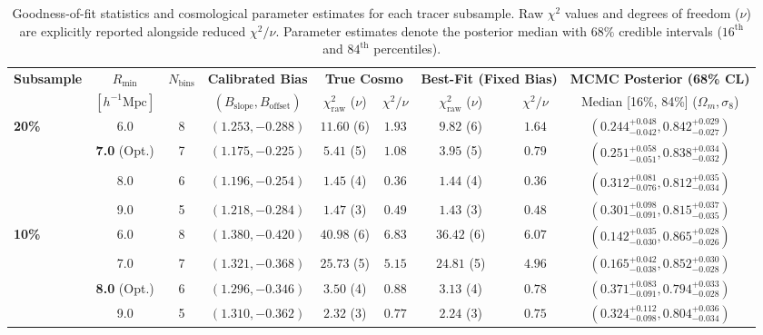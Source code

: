 \documentclass[12pt]{report}
\begin{document}
\begin{table}[H]
    \centering
    \caption{Goodness-of-fit statistics and cosmological parameter estimates for each tracer subsample. Raw $\chi^2$ values and degrees of freedom ($\nu$) are explicitly reported alongside reduced $\chi^2/\nu$. Parameter estimates denote the posterior median with $68\%$ credible intervals ($16^{\mathrm{th}}$ and $84^{\mathrm{th}}$ percentiles).}
    \label{tab:subsample_scan_results}
    \setlength{\tabcolsep}{5pt}
    \small
    \begin{tabular}{lcccccccc}
        \toprule
        \textbf{Subsample} & \textbf{$R_{\mathrm{min}}$} & \textbf{$N_{\mathrm{bins}}$} & \textbf{Calibrated Bias} & \multicolumn{2}{c}{\textbf{True Cosmo}} & \multicolumn{2}{c}{\textbf{Best-Fit (Fixed Bias)}} & \textbf{MCMC Posterior (68\% CL)} \\
        & $[h^{-1}\mathrm{Mpc}]$ & & $(B_{\mathrm{slope}}, B_{\mathrm{offset}})$ & $\chi^2_{\mathrm{raw}}$ ($\nu$) & $\chi^2/\nu$ & $\chi^2_{\mathrm{raw}}$ ($\nu$) & $\chi^2/\nu$ & Median [16\%, 84\%] ($\Omega_m, \sigma_8$) \\
        \midrule
        \textbf{20\%} 
        & 6.0 & 8 & $(1.253, -0.288)$ & $11.60$ (6) & $1.93$ & $9.82$ (6) & $1.64$ & $(0.244^{+0.048}_{-0.042}, 0.842^{+0.029}_{-0.027})$ \\
        & \textbf{7.0} (Opt.) & 7 & $(1.175, -0.225)$ & $5.41$ (5) & $\mathbf{1.08}$ & $3.95$ (5) & $\mathbf{0.79}$ & $\mathbf{(0.251^{+0.058}_{-0.051}, 0.838^{+0.034}_{-0.032})}$ \\
        & 8.0 & 6 & $(1.196, -0.254)$ & $1.45$ (4) & $0.36$ & $1.44$ (4) & $0.36$ & $(0.312^{+0.081}_{-0.076}, 0.812^{+0.035}_{-0.034})$ \\
        & 9.0 & 5 & $(1.218, -0.284)$ & $1.47$ (3) & $0.49$ & $1.43$ (3) & $0.48$ & $(0.301^{+0.098}_{-0.091}, 0.815^{+0.037}_{-0.035})$ \\
        \midrule
        \textbf{10\%} 
        & 6.0 & 8 & $(1.380, -0.420)$ & $40.98$ (6) & $6.83$ & $36.42$ (6) & $6.07$ & $(0.142^{+0.035}_{-0.030}, 0.865^{+0.028}_{-0.026})$ \\
        & 7.0 & 7 & $(1.321, -0.368)$ & $25.73$ (5) & $5.15$ & $24.81$ (5) & $4.96$ & $(0.165^{+0.042}_{-0.038}, 0.852^{+0.030}_{-0.028})$ \\
        & \textbf{8.0} (Opt.) & 6 & $(1.296, -0.346)$ & $3.50$ (4) & $\mathbf{0.88}$ & $3.13$ (4) & $\mathbf{0.78}$ & $\mathbf{(0.371^{+0.083}_{-0.091}, 0.794^{+0.033}_{-0.028})}$ \\
        & 9.0 & 5 & $(1.310, -0.362)$ & $2.32$ (3) & $0.77$ & $2.24$ (3) & $0.75$ & $(0.324^{+0.112}_{-0.098}, 0.804^{+0.036}_{-0.034})$ \\

\end{tabular}
\end{table}
\end{document}
